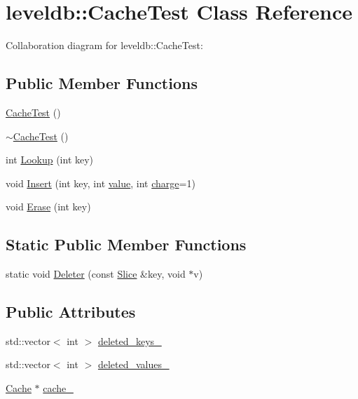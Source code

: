 \hypertarget{classleveldb_1_1_cache_test}{\section{leveldb\-:\-:Cache\-Test Class Reference}
\label{classleveldb_1_1_cache_test}
}


Collaboration diagram for leveldb\-:\-:Cache\-Test\-:
\subsection*{Public Member Functions}
\begin{DoxyCompactItemize}
\item 
\hyperlink{classleveldb_1_1_cache_test_abfea0e2ae3ee11b62d1f6b622ef47334}{Cache\-Test} ()
\item 
\hyperlink{classleveldb_1_1_cache_test_a2591fd9f81069e507206aef8f4d91660}{$\sim$\-Cache\-Test} ()
\item 
int \hyperlink{classleveldb_1_1_cache_test_a90d19cd6098f10f809f0c3b94e8b3fc6}{Lookup} (int key)
\item 
void \hyperlink{classleveldb_1_1_cache_test_ad7fc76253a92137e62aede17322c7286}{Insert} (int key, int \hyperlink{cache_8cc_a0f61d63b009d0880a89c843bd50d8d76}{value}, int \hyperlink{cache_8cc_a7476acc4f60747f9d9032e9cbdf5eb79}{charge}=1)
\item 
void \hyperlink{classleveldb_1_1_cache_test_aeaa81bbd9d0fba1fb31b0a8f7aa94397}{Erase} (int key)
\end{DoxyCompactItemize}
\subsection*{Static Public Member Functions}
\begin{DoxyCompactItemize}
\item 
static void \hyperlink{classleveldb_1_1_cache_test_aa8d3ce31a1995da33810f2b5320089ab}{Deleter} (const \hyperlink{classleveldb_1_1_slice}{Slice} \&key, void $\ast$v)
\end{DoxyCompactItemize}
\subsection*{Public Attributes}
\begin{DoxyCompactItemize}
\item 
std\-::vector$<$ int $>$ \hyperlink{classleveldb_1_1_cache_test_aad6b825748f29b973a8934682eb50ed2}{deleted\-\_\-keys\-\_\-}
\item 
std\-::vector$<$ int $>$ \hyperlink{classleveldb_1_1_cache_test_add979edecc72f9740b1d6d4951c13c02}{deleted\-\_\-values\-\_\-}
\item 
\hyperlink{classleveldb_1_1_cache}{Cache} $\ast$ \hyperlink{classleveldb_1_1_cache_test_af2edcc8a47148050ba791f6a2b7a6165}{cache\-\_\-}
\end{DoxyCompactItemize}
